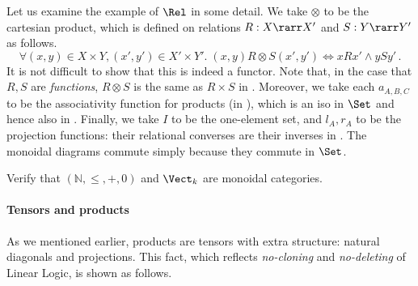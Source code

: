 \documentclass{svmult}
\begin{document}
%
Let us examine the example of $\Rel$ in some detail. We take $\otimes$ to be the cartesian product, which is defined on relations $R:X\rarr X'$ and
$S:Y\rarr Y'$ as follows.
\[ \forall(x,y)\in X\times Y,(x',y')\in X'\times Y'.\; (x,y)R\otimes S(x',y')\iff xRx'\land ySy'\,. \]
%
It is not difficult to show that this is  indeed a functor. Note that, in the case that $R,S$ are \emph{functions}, $R\otimes S$ is the same as $R\times S$ in
\Set. Moreover, we take each $a_{A,B,C}$ to be the associativity function for products (in \Set), which is an iso in $\Set$ and hence also in \Rel.
Finally, we take $I$ to be the one-element set, and $l_A,r_A$ to be the projection functions: their relational converses are their inverses in \Rel.
The monoidal diagrams commute simply because they commute in $\Set$.
\begin{myexercise}
Verify that $(\mathbb{N}, \leq , + , 0)$ and $\Vect_k$ are monoidal categories.
\end{myexercise}

\paragraph{Tensors and products}
As we mentioned earlier, products are tensors with extra structure: natural diagonals and projections. This fact, which reflects \emph{no-cloning} and
\emph{no-deleting} of Linear Logic, is shown as follows.
\end{document}
